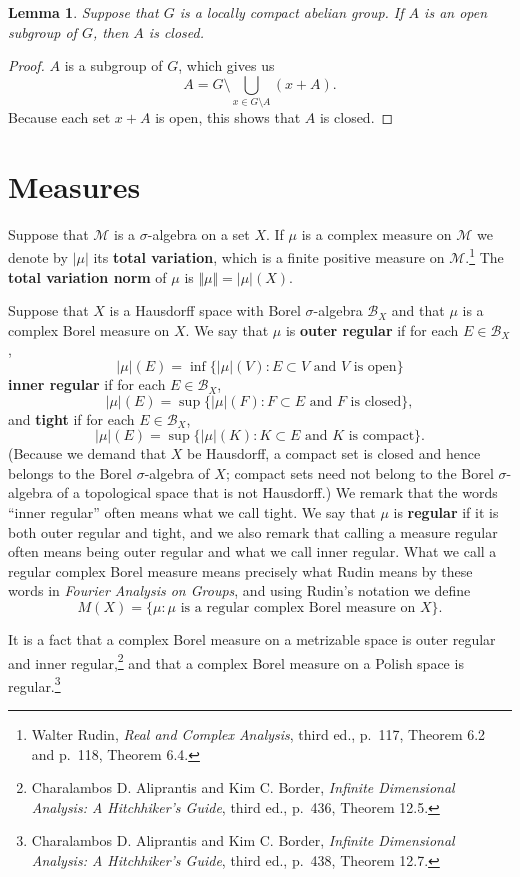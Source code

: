 \documentclass{article}
\newcommand{\norm}[1]{\Vert #1 \Vert}
\newtheorem{lemma}[theorem]{Lemma}
\begin{document}
\begin{lemma}
Suppose that $G$ is a locally compact abelian group. If $A$ is an open subgroup of $G$, then $A$ is closed.
\end{lemma}
\begin{proof}
$A$ is a subgroup of $G$, which gives us 
\[
A = G \setminus \bigcup_{x \in G \setminus A} (x+A).
\]
Because each set $x+A$ is open, this shows that $A$ is closed.
\end{proof}


\section{Measures}
Suppose that $\mathscr{M}$ is a $\sigma$-algebra on a set $X$.
If $\mu$ is a complex measure on $\mathscr{M}$ we denote by $|\mu|$ its \textbf{total variation}, which is a finite positive
measure on $\mathscr{M}$.\footnote{Walter Rudin, {\em Real and Complex Analysis}, third ed., p.~117, Theorem 6.2 and p.~118, Theorem 6.4.} The \textbf{total variation norm} of $\mu$ is $\norm{\mu}=|\mu|(X)$. 

Suppose that $X$ is a Hausdorff space with Borel $\sigma$-algebra $\mathscr{B}_X$ and that $\mu$ is a complex Borel measure on $X$. 
We say that $\mu$ is
\textbf{outer regular} if for each $E \in \mathscr{B}_X$,
\[
|\mu|(E) = \inf\{|\mu|(V): \textrm{$E \subset V$ and $V$ is open}\}
\]
\textbf{inner regular} if for each $E \in \mathscr{B}_X$,
\[
|\mu|(E) = \sup\{|\mu|(F): \textrm{$F \subset E$ and $F$ is closed}\},
\]
and \textbf{tight} if  for each $E \in \mathscr{B}_X$,
\[
|\mu|(E) = \sup\{|\mu|(K): \textrm{$K \subset E$ and $K$ is compact}\}.
\]
(Because we demand that $X$ be Hausdorff, a compact set is closed and hence belongs to the Borel
$\sigma$-algebra of $X$; compact sets need not belong to the Borel $\sigma$-algebra of a topological space that is not Hausdorff.)
We remark that the words ``inner regular'' often means what we call tight. We say that $\mu$ is \textbf{regular} if it is both outer
regular and tight, and we also remark that calling a measure regular often means being outer regular
and what we call inner regular. What we call a regular complex Borel measure means precisely what Rudin means by these
words in  {\em Fourier Analysis on Groups}, and using Rudin's notation we define
\[
M(X) = \{\mu: \textrm{$\mu$ is a regular complex Borel measure on $X$}\}.
\]

 It is a fact that a complex Borel measure on a metrizable space
is outer regular and inner regular,\footnote{Charalambos D. Aliprantis and Kim C. Border,
{\em Infinite Dimensional Analysis: A Hitchhiker's Guide}, third ed., p.~436, Theorem 12.5.} and that a complex Borel measure on a Polish
space is regular.\footnote{Charalambos D. Aliprantis and Kim C. Border,
{\em Infinite Dimensional Analysis: A Hitchhiker's Guide}, third ed., p.~438, Theorem 12.7.} 
\end{document}
